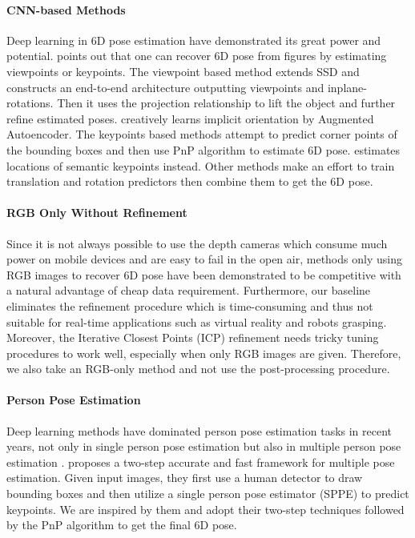 \documentclass[10pt,twocolumn,letterpaper]{article}
\begin{document}
\paragraph{CNN-based Methods} Deep learning in 6D pose estimation have demonstrated its great power and potential. \cite{7298758} points out that one can recover 6D pose from figures by estimating viewpoints or keypoints. The viewpoint based method  \cite{Kehl2017SSD6DMR} extends SSD \cite{10.1007/978-3-319-46448-0_2} and constructs an end-to-end architecture outputting viewpoints and inplane-rotations. Then it uses the projection relationship to lift the object and further refine estimated poses. \cite{Sundermeyer_2018_ECCV} creatively learns implicit orientation by Augmented Autoencoder. The keypoints based methods \cite{Rad2017BB8AS, tekin18} attempt to predict corner points of the bounding boxes and then use PnP algorithm to estimate 6D pose. \cite{pavlakos17object3d} estimates locations of semantic keypoints instead. Other methods \cite{Kendall2015PoseNetAC, xiang2018posecnn} make an effort to train translation and rotation predictors then combine them to get the 6D pose.

\paragraph{RGB Only Without Refinement} Since it is not always possible to use the depth cameras which consume much power on mobile devices and are easy to fail in the open air, methods only using RGB images to recover 6D pose have been demonstrated to be competitive \cite{Kehl2017SSD6DMR, Mousavian20173DBB, Poirson2016FastSS} with a natural advantage of cheap data requirement. Furthermore, our baseline \cite{tekin18} eliminates the refinement procedure which is time-consuming and thus not suitable for real-time applications such as virtual reality and robots grasping. Moreover, the Iterative Closest Points (ICP) refinement needs tricky tuning procedures to work well, especially when only RGB images are given. Therefore, we also take an RGB-only method and not use the post-processing procedure.

\paragraph{Person Pose Estimation} Deep learning methods have dominated person pose estimation tasks in recent years, not only in single person pose estimation \cite{Jain2013LearningHP, Ouyang2014MultisourceDL, 6909610} but also in multiple person pose estimation \cite{cao2017realtime, fang2017rmpe, He2017MaskR}. \cite{fang2017rmpe} proposes a two-step accurate and fast framework for multiple pose estimation. Given input images, they first use a human detector to draw bounding boxes and then utilize a single person pose estimator (SPPE) to predict keypoints. We are inspired by them and adopt their two-step techniques followed by the PnP algorithm to get the final 6D pose.
\end{document}
